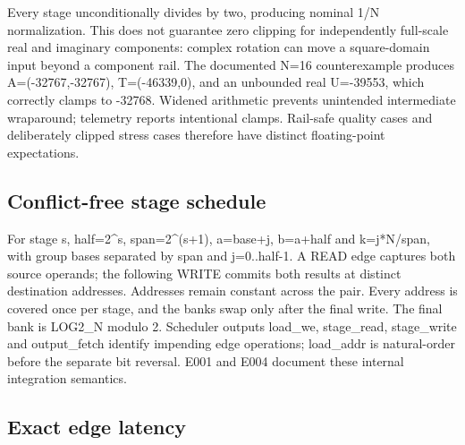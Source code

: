 \documentclass[11pt,a4paper]{article}
\begin{document}
Every stage unconditionally divides by two,\allowbreak{} producing nominal 1/\allowbreak{}N normalization. This does not guarantee zero clipping for independently full-scale real and imaginary components: complex rotation can move a square-domain input beyond a component rail. The documented N=\allowbreak{}16 counterexample produces A=\allowbreak{}(\allowbreak{}-32767,\allowbreak{}-32767)\allowbreak{},\allowbreak{} T=\allowbreak{}(\allowbreak{}-46339,\allowbreak{}0)\allowbreak{},\allowbreak{} and an unbounded real U=\allowbreak{}-39553,\allowbreak{} which correctly clamps to -32768. Widened arithmetic prevents unintended intermediate wraparound; telemetry reports intentional clamps. Rail-safe quality cases and deliberately clipped stress cases therefore have distinct floating-point expectations.

\subsection{Conflict-free stage schedule}

For stage s,\allowbreak{} half=\allowbreak{}2\textasciicircum{}s,\allowbreak{} span=\allowbreak{}2\textasciicircum{}(\allowbreak{}s+\allowbreak{}1)\allowbreak{},\allowbreak{} a=\allowbreak{}base+\allowbreak{}j,\allowbreak{} b=\allowbreak{}a+\allowbreak{}half and k=\allowbreak{}j*\allowbreak{}N/\allowbreak{}span,\allowbreak{} with group bases separated by span and j=\allowbreak{}0..half-1. A READ edge captures both source operands; the following WRITE commits both results at distinct destination addresses. Addresses remain constant across the pair. Every address is covered once per stage,\allowbreak{} and the banks swap only after the final write. The final bank is LOG2\_\allowbreak{}N modulo 2. Scheduler outputs load\_\allowbreak{}we,\allowbreak{} stage\_\allowbreak{}read,\allowbreak{} stage\_\allowbreak{}write and output\_\allowbreak{}fetch identify impending edge operations; load\_\allowbreak{}addr is natural-order before the separate bit reversal. E001 and E004 document these internal integration semantics.

\subsection{Exact edge latency}
\end{document}
